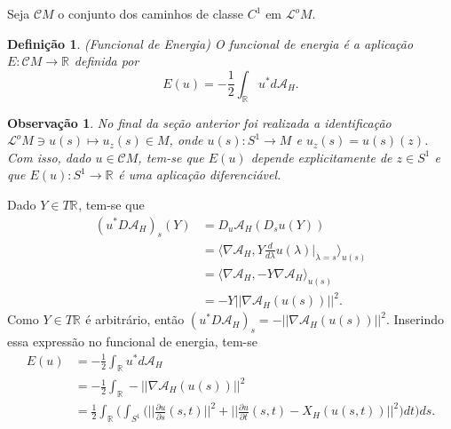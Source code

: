 \documentclass[12pt]{book}
\newtheorem{definicao}[teorema]{Definição}
\newtheorem{observacao}[teorema]{Observação}
\newcommand{\bigparenteses}[1]{\Big( #1 \Big) }
\newcommand{\campohamiltoniano}[1]{X_{H}(#1)}
\newcommand{\circulo}{S^{1}}
\newcommand{\derivada}[2]{\frac{d #1}{d #2}}
\newcommand{\derivadaparcial}[2]{\frac{\partial #1}{\partial #2}}
\newcommand{\funcionalH}{\mathcal{A}_{H}}
\newcommand{\gradientefuncional}{\nabla \funcionalH}
\newcommand{\norma}[1]{||#1||}
\newcommand{\normagrande}[1]{\Big|\Big|#1\Big|\Big|}
\newcommand{\produtointerno}[2]{\langle #1, #2 \rangle}
\newcommand{\real}[1]{\mathbb{R}^{#1}}
\newcommand{\reta}{\real{}}
\newcommand{\lacocontrateis}{\mathcal{L}^{o}M}
\newcommand{\cilindrosLM}{\mathcal{C}M}
\begin{document}
	Seja $\cilindrosLM$ o conjunto dos caminhos de classe $C^{1}$ em $\lacocontrateis$.
	
	\begin{definicao}
		(Funcional de Energia) O funcional de energia é a aplicação $E: \cilindrosLM \to \reta$ definida por
		$$
		E(u) = -\frac{1}{2}\int_{\reta}u^{*}d\funcionalH.
		$$
	\end{definicao}
	
	\begin{observacao}
		No final da seção anterior foi realizada a identificação $\lacocontrateis \ni u(s) \mapsto u_{z}(s)\in M $, onde $u(s):\circulo\to M$ e $u_{z}(s) = u(s)(z)$.
		Com isso, dado $u \in \cilindrosLM$, tem-se que $E(u)$ depende explicitamente de $z \in \circulo$ e que $E(u):\circulo\to \reta$ é uma aplicação diferenciável.
	\end{observacao}
	
	Dado $Y \in T\reta$, tem-se que
	$$
	\begin{aligned}
	(u^{*}D\funcionalH)_{s}(Y) &= D_{u}\funcionalH(D_{s}u(Y))
	\\
	&=\produtointerno{\gradientefuncional}{Y\derivada{}{\lambda}u(\lambda)|_{\lambda=s}}_{u(s)}
	\\
	&=\produtointerno{\gradientefuncional}{-Y\gradientefuncional}_{u(s)}
	\\
	&=-Y\norma{\gradientefuncional(u(s))}^{2}.
	\end{aligned}
	$$
	Como $Y\in T\reta$ é arbitrário, então $(u^{*}D\funcionalH)_{s} = -\norma{\gradientefuncional(u(s))}^{2}$. Inserindo essa expressão no funcional de energia, tem-se
	$$
	\begin{aligned}
			E(u)
			&=-\frac{1}{2}\int_{\reta}u^{*}d\funcionalH 
			\\
			&= -\frac{1}{2}\int_{\reta}-\norma{\gradientefuncional(u(s))}^{2}
			\\
			&= \frac{1}{2}\int_{\reta}\bigparenteses{ \int_{\circulo} \bigparenteses{\normagrande{\derivadaparcial{u}{s}(s,t)}^{2} + \normagrande{\derivadaparcial{u}{t}(s,t) - \campohamiltoniano{u(s,t)}}^{2}} dt }ds.
	\end{aligned}
	$$
	
\end{document}
